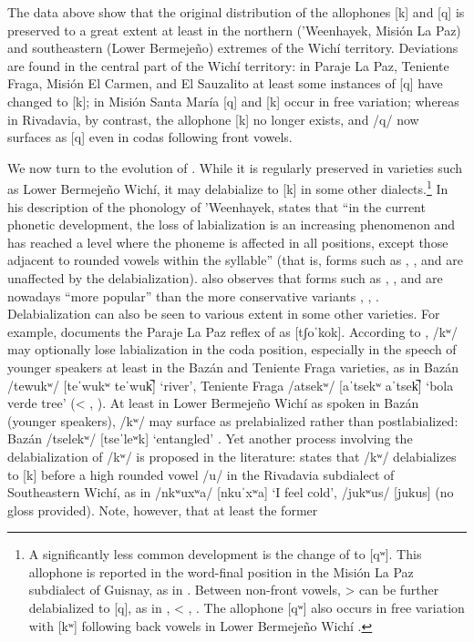 The data above show that the original distribution of the allophones [k] and [q] is preserved to a great extent at least in the northern (’Weenhayek, Misión La Paz) and southeastern (Lower Bermejeño) extremes of the Wichí territory. Deviations are found in the central part of the Wichí territory: in Paraje La Paz, Teniente Fraga, Misión El Carmen, and El Sauzalito at least some instances of [q] have changed to [k]; in Misión Santa María [q] and [k] occur in free variation; whereas in Rivadavia, by contrast, the allophone [k] no longer exists, and /q/ now surfaces as [q] even in codas following front vowels.
    
We now turn to the evolution of . While it is regularly preserved in varieties such as Lower Bermejeño Wichí, it may delabialize to [k] in some other dialects.\footnote{A significantly less common development is the change of  to [qʷ]. This allophone is reported in the word-final position in the Misión La Paz subdialect of Guisnay, as in  \citep[44]{MA08}. Between non-front vowels,  >  can be further delabialized to [q], as in ,  < , . The allophone [qʷ] also occurs in free variation with [kʷ] following back vowels in Lower Bermejeño Wichí \citep[49]{VN14}.} In his description of the phonology of 'Weenhayek, \citet[19]{KC94} states that ``in the current phonetic development, the loss of labialization is an increasing phenomenon and has reached a level where the phoneme is affected in all positions, except those adjacent to rounded vowels within the syllable'' (that is, forms such as , , and  are unaffected by the delabialization). \citet[19]{KC94} also observes that forms such as , , and  are nowadays ``more popular'' than the more conservative variants , , . Delabialization can also be seen to various extent in some other varieties. For example, \citet{AFG067} documents the Paraje La Paz reflex of  as [tʃoˈkok]. According to \citet[139]{MC09}, /kʷ/ may optionally lose labialization in the coda position, especially in the speech of younger speakers at least in the Bazán and Teniente Fraga varieties, as in Bazán /tewukʷ/ [teˈwukʷ \recind teˈwuk̚] ‘river’, Teniente Fraga /atsekʷ/ [aˈtsekʷ \recind aˈtsek̚] ‘bola verde tree’ (< , ). At least in Lower Bermejeño Wichí as spoken in Bazán (younger speakers), /kʷ/ may surface as prelabialized rather than postlabialized: Bazán /tselekʷ/ [tseˈleʷk] ‘entangled’ \citep[140]{MC09}. Yet another process involving the delabialization of /kʷ/ is proposed in the literature: \citet[63]{JT09-cap} states that /kʷ/ delabializes to [k] before a high rounded vowel /u/ in the Rivadavia subdialect of Southeastern Wichí, as in /nkʷuxʷa/ [nkuˈxʷa] `I feel cold', /jukʷus/ [jukus] (no gloss provided). Note, however, that at least the former 